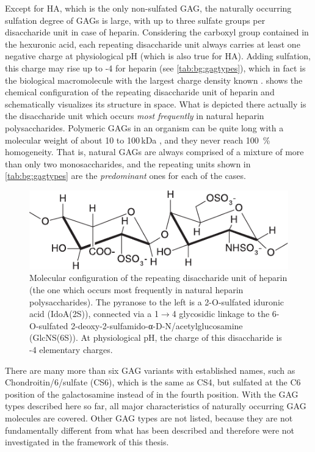 Except for HA, which is the only non-sulfated GAG, the naturally occurring
sulfation degree of GAGs is large, with up to three sulfate groups per
disaccharide unit in case of heparin. Considering the carboxyl group contained
in the hexuronic acid, each repeating disaccharide unit always carries at least
one negative charge at physiological pH (which is also true for HA). Adding
sulfation, this charge may rise up to -4 for heparin (see
\cref{tab:bg:gagtypes}), which in fact is the biological macromolecule with the
largest charge density known \cite{capila_linhardt_hep_prot_2002}.
 shows the chemical configuration of the
repeating disaccharide unit of heparin and schematically visualizes its
structure in space. What is depicted there actually is the disaccharide unit
which occurs \textit{most frequently} in natural heparin polysaccharides.
Polymeric GAGs in an organism can be quite long with a molecular weight of about
10 to 100\,kDa \cite{gandhi_structure_2008}, and they never reach
\SI{100}{\percent} homogeneity. That is, natural GAGs are always comprised of a
mixture of more than only two monosaccharides, and the repeating units shown in
\cref{tab:bg:gagtypes} are the \textit{predominant} ones for each of the cases.

\begin{figure}
\centering
\includegraphics[width=1.0\textwidth]{gfx/background/hp_repeating_unit_structure_01.pdf}
\caption[]{
Molecular configuration of the repeating disaccharide unit of heparin (the one
which occurs most frequently in natural heparin polysaccharides). The pyranose
to the left is a 2-O-sulfated iduronic acid (IdoA(2S)), connected via a
1$\rightarrow$4 glycosidic linkage to the 6-O-sulfated
2-deoxy-2-sulfamido-α-D-N\-/acetylglucosamine (GlcNS(6S)). At physiological pH,
the charge of this disaccharide is -4 elementary charges.
}
\label{fig:bg:heparin_chemstruct}
\end{figure}

There are many more than six GAG variants with established names, such as
Chondroitin\-/6\-/sulfate (CS6), which is the same as CS4, but sulfated at the
C6 position of the galactosamine instead of in the fourth position. With the GAG
types described here so far, all major characteristics of naturally occurring
GAG molecules are covered. Other GAG types are not listed, because they are not
fundamentally different from what has been described and therefore were not
investigated in the framework of this thesis.

